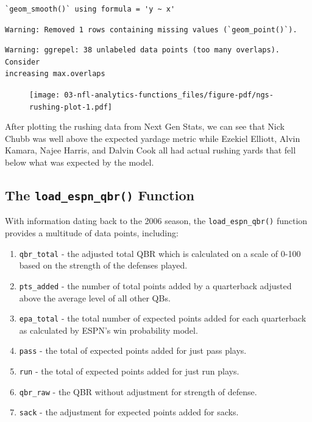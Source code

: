 \documentclass[
  letterpaper,
]{krantz}
\providecommand{\tightlist}{%
  \setlength{\itemsep}{0pt}\setlength{\parskip}{0pt}}\usepackage{longtable,booktabs,array}
\begin{document}
\begin{verbatim}
`geom_smooth()` using formula = 'y ~ x'
\end{verbatim}

\begin{verbatim}
Warning: Removed 1 rows containing missing values (`geom_point()`).
\end{verbatim}

\begin{verbatim}
Warning: ggrepel: 38 unlabeled data points (too many overlaps). Consider
increasing max.overlaps
\end{verbatim}

\begin{figure}[H]

{\centering \texttt{[image: 03-nfl-analytics-functions\_files/figure-pdf/ngs-rushing-plot-1.pdf]}

}

\end{figure}

After plotting the rushing data from Next Gen Stats, we can see that
Nick Chubb was well above the expected yardage metric while Ezekiel
Elliott, Alvin Kamara, Najee Harris, and Dalvin Cook all had actual
rushing yards that fell below what was expected by the model.

\hypertarget{the-load_espn_qbr-function}{%
\subsection{\texorpdfstring{The \texttt{load\_espn\_qbr()}
Function}{The load\_espn\_qbr() Function}}\label{the-load_espn_qbr-function}}

With information dating back to the 2006 season, the
\texttt{load\_espn\_qbr()} function provides a multitude of data points,
including:

\begin{enumerate}
\def\labelenumi{\arabic{enumi}.}
\tightlist
\item
  \texttt{qbr\_total} - the adjusted total QBR which is calculated on a
  scale of 0-100 based on the strength of the defenses played.
\item
  \texttt{pts\_added} - the number of total points added by a
  quarterback adjusted above the average level of all other QBs.
\item
  \texttt{epa\_total} - the total number of expected points added for
  each quarterback as calculated by ESPN's win probability model.
\item
  \texttt{pass} - the total of expected points added for just pass
  plays.
\item
  \texttt{run} - the total of expected points added for just run plays.
\item
  \texttt{qbr\_raw} - the QBR without adjustment for strength of
  defense.
\item
  \texttt{sack} - the adjustment for expected points added for sacks.
\end{enumerate}
\end{document}
